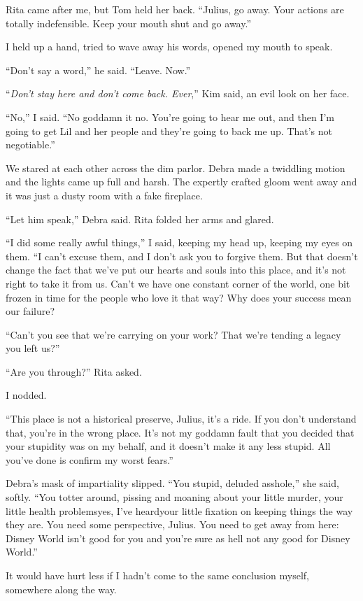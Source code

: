 Rita came after me, but Tom held her back. “Julius, go away. Your
actions are totally indefensible. Keep your mouth shut and go
away.”

I held up a hand, tried to wave away his words, opened my mouth to
speak.

“Don't say a word,” he said. “Leave. Now.”

“\emph{Don't stay here and don't come back. Ever},” Kim said, an
evil look on her face.

“No,” I said. “No goddamn it no. You're going to hear me out, and
then I'm going to get Lil and her people and they're going to back
me up. That's not negotiable.”

We stared at each other across the dim parlor. Debra made a
twiddling motion and the lights came up full and harsh. The
expertly crafted gloom went away and it was just a dusty room with
a fake fireplace.

“Let him speak,” Debra said. Rita folded her arms and glared.

“I did some really awful things,” I said, keeping my head up,
keeping my eyes on them. “I can't excuse them, and I don't ask you
to forgive them. But that doesn't change the fact that we've put
our hearts and souls into this place, and it's not right to take it
from us. Can't we have one constant corner of the world, one bit
frozen in time for the people who love it that way? Why does your
success mean our failure?

“Can't you see that we're carrying on your work? That we're tending
a legacy you left us?”

“Are you through?” Rita asked.

I nodded.

“This place is not a historical preserve, Julius, it's a ride. If
you don't understand that, you're in the wrong place. It's not my
goddamn fault that you decided that your stupidity was on my
behalf, and it doesn't make it any less stupid. All you've done is
confirm my worst fears.”

Debra's mask of impartiality slipped. “You stupid, deluded
asshole,” she said, softly. “You totter around, pissing and moaning
about your little murder, your little health problems{\dash}yes, I've
heard{\dash}your little fixation on keeping things the way they are. You
need some perspective, Julius. You need to get away from here:
Disney World isn't good for you and you're sure as hell not any
good for Disney World.”

It would have hurt less if I hadn't come to the same conclusion
myself, somewhere along the way.

